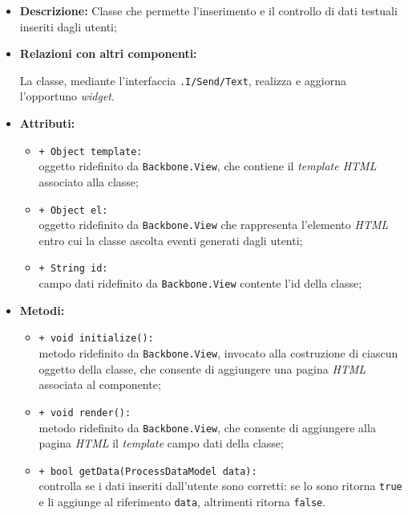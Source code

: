 \begin{flushleft}
\begin{itemize}
\item \textbf{Descrizione:} Classe che permette l'inserimento e il controllo di dati testuali inseriti dagli utenti;
\item \textbf{Relazioni con altri componenti:}
\begin{sloppypar}
La classe, mediante l'interfaccia \texttt{\viewUser{}.I\fshyp{}Send\fshyp{}Text}, realizza e aggiorna l'opportuno \textit{widget}.
\end{sloppypar}
\item \textbf{Attributi:}
\begin{sloppypar}
\begin{itemize}
\item \texttt{+ Object template:}\\ oggetto ridefinito da \texttt{Backbone.View}, che contiene il \textit{template HTML} associato alla classe;
\item \texttt{+ Object el:}\\ oggetto ridefinito da \texttt{Backbone.View} che rappresenta l'elemento \textit{HTML} entro cui la classe ascolta eventi generati dagli utenti;
\item \texttt{+ String id:}\\ campo dati ridefinito da \texttt{Backbone.View} contente l'id della classe;
\end{itemize}
\end{sloppypar}
\item \textbf{Metodi:}
\begin{sloppypar}
\begin{itemize}
\item \texttt{+ void initialize():}\\ metodo ridefinito da \texttt{Backbone.View}, invocato alla costruzione di ciascun oggetto della classe, che consente di aggiungere una pagina \textit{HTML} associata al componente;
\item \texttt{+ void render():}\\ metodo ridefinito da \texttt{Backbone.View}, che consente di aggiungere alla pagina \textit{HTML} il \textit{template} campo dati della classe;
\item \texttt{+ bool getData(ProcessDataModel data):}\\ controlla se i dati inseriti dall'utente sono corretti: se lo sono ritorna \texttt{true} e li aggiunge al riferimento \texttt{data}, altrimenti ritorna \texttt{false}.
\end{itemize}
\end{sloppypar}
\end{itemize}
\end{flushleft}

